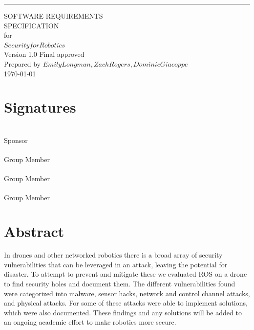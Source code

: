 \documentclass{scrreprt}
\date{}
\def\myversion{1.0 Final }
\begin{document}
\begin{flushright}
    \rule{16cm}{5pt}\vskip1cm
    \begin{bfseries}
        \Huge{SOFTWARE REQUIREMENTS\\ SPECIFICATION}\\
        \vspace{1.9cm}
        for\\
        \vspace{1.9cm}
        $Security for Robotics$\\
        \vspace{1.9cm}
        \LARGE{Version \myversion approved}\\
        \vspace{1.9cm}
        Prepared by $Emily Longman, Zach Rogers, Dominic Giacoppe$\\
        \vspace{1.9cm}
        \today\\
    \end{bfseries}
\end{flushright}

\tableofcontents

\chapter{Signatures}
\vspace{2in}
\makebox[2.5in]{\hrulefill} \hspace {1.0in}\makebox[2.5in]{\hrulefill} \\
Sponsor  \\

\vspace{.2in}
\makebox[2.5in]{\hrulefill} \hspace {1.0in}\makebox[2.5in]{\hrulefill} \\
Group Member  \\

\vspace{.2in}
\makebox[2.5in]{\hrulefill} \hspace {1.0in}\makebox[2.5in]{\hrulefill} \\
Group Member  \\

\vspace{.2in}
\makebox[2.5in]{\hrulefill} \hspace {1.0in}\makebox[2.5in]{\hrulefill} \\
Group Member  \\

\chapter{Abstract}
In drones and other networked robotics there is a broad array of security vulnerabilities that can be leveraged in an attack, leaving the potential for disaster.
To attempt to prevent and mitigate these we evaluated ROS on a drone to find security holes and document them.
The different vulnerabilities found were categorized into malware, sensor hacks, network and control channel attacks, and physical attacks.
For some of these attacks were able to implement solutions, which were also documented.
These findings and any solutions will be added to an ongoing academic effort to make robotics more secure.
\end{document}
